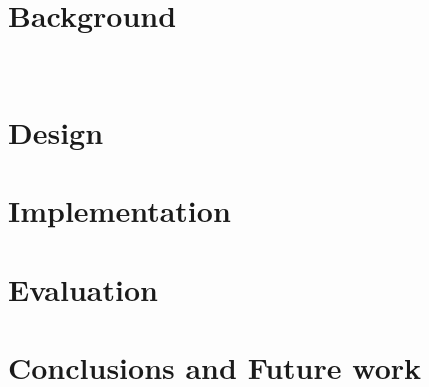 \documentclass[]{report}
\begin{document}


\chapter{Background}




~\cite{dunkels04contiki}

\chapter{Design}
\label{sect:design}

\chapter{Implementation}
\label{sect:implementation}


\chapter{Evaluation}
\label{sect:evaluation}




\chapter{Conclusions and Future work}
\label{sect:conclusions}




\end{document}
